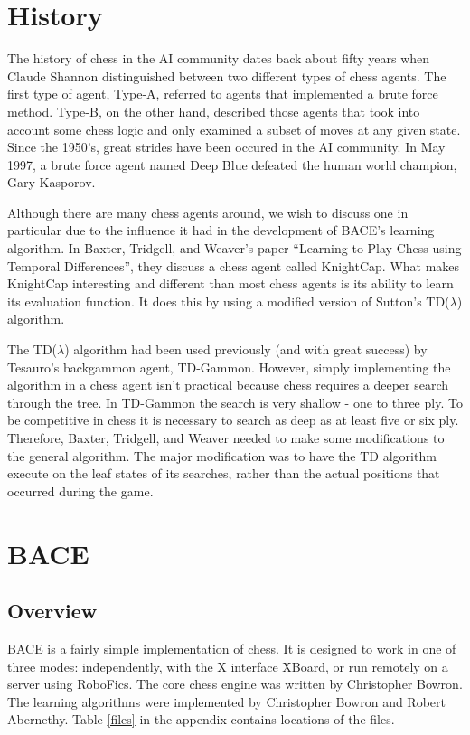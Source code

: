 \documentclass{article}
\begin{document}
\section{History}

The history of chess in the AI community dates back about fifty years
when Claude Shannon distinguished between two different types of chess
agents.  The first type of agent, Type-A, referred to agents that
implemented a brute force method.  Type-B, on the other hand,
described those agents that took into account some chess logic and
only examined a subset of moves at any given state.  Since the 1950's,
great strides have been occured in the AI community.  In May 1997, a
brute force agent named Deep Blue defeated the human world champion,
Gary Kasporov.  

Although there are many chess agents around, we wish to discuss one in
particular due to the influence it had in the development of BACE's
learning algorithm.  In
Baxter, Tridgell, and Weaver's paper ``Learning to Play Chess using
Temporal Differences'', they discuss a chess agent called KnightCap.
What makes KnightCap interesting and different than most chess agents
is its ability to learn its evaluation function.  It does this by
using a modified version of Sutton's TD($\lambda$) algorithm. 

The TD($\lambda$) algorithm had been used previously (and with great
success) 
by Tesauro's backgammon agent, TD-Gammon.  However, simply
implementing the algorithm in a chess agent isn't practical because
chess requires a deeper search through the tree.  In TD-Gammon the
search is very shallow - one to three ply.  To be competitive in chess
it is necessary to search as deep as at least five or six ply.
Therefore, Baxter, Tridgell, and Weaver needed to make some
modifications to the 
general algorithm.  The major modification was to have the TD
algorithm execute on the leaf states of its searches, rather than the
actual positions that occurred during the game. 


\section{BACE}

\subsection{Overview}
BACE is a fairly simple implementation of chess.  It is designed to
work in one of three modes:  independently, with the X interface XBoard, or run
remotely on a server using RoboFics.  The core chess engine
was written by Christopher Bowron.  The learning algorithms were
implemented by Christopher Bowron and Robert Abernethy.  Table
\ref{files} in the appendix contains locations of the files.
\end{document}
